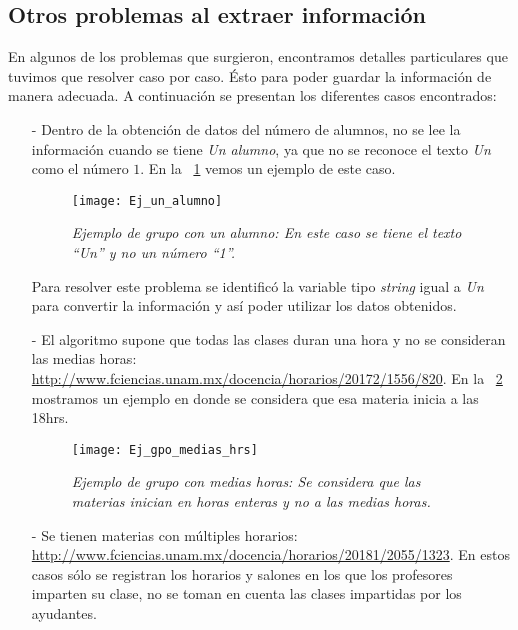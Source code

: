 \subsection{Otros problemas al extraer información}

En algunos de los problemas que surgieron, encontramos detalles particulares que tuvimos que resolver caso por caso. Ésto para poder guardar la información de manera adecuada. A continuación se presentan los diferentes casos encontrados:

  \begin{itemize}
\item[-] Dentro de la obtención de datos del número de alumnos, no se lee la información cuando se tiene \textit{Un alumno}, ya que no se reconoce el texto \textit{Un} como el número $1$. En la \figurename{~\ref{UnAlumno}} vemos un ejemplo de este caso.

\begin{figure}[H]
\centering
\texttt{[image: Ej\_un\_alumno]} %
\caption[\textit{Ejemplo de grupo con un alumno}]{\textit{Ejemplo de grupo con un alumno: En este caso se tiene el texto ``Un'' y no un número ``1''.}}\label{UnAlumno}
\end{figure}

Para resolver este problema se identificó la variable tipo \textit{string} igual a \textit{Un} para convertir la información y así poder utilizar los datos obtenidos.

\item[-] El algoritmo supone que todas las clases duran una hora y no se consideran las medias horas: \url{http://www.fciencias.unam.mx/docencia/horarios/20172/1556/820}. En la \figurename{~\ref{MediasHoras}} mostramos un ejemplo en donde se considera que esa materia inicia a las 18hrs.

\begin{figure}[H]
\centering
\texttt{[image: Ej\_gpo\_medias\_hrs]} %
\caption[\textit{Ejemplo de grupo con medias horas}]{\textit{Ejemplo de grupo con medias horas: Se considera que las materias inician en horas enteras y no a las medias horas.}}\label{MediasHoras}
\end{figure}

\item[-] Se tienen materias con múltiples horarios: \url{http://www.fciencias.unam.mx/docencia/horarios/20181/2055/1323}. En estos casos sólo se registran los horarios y salones en los que los profesores imparten su clase, no se toman en cuenta las clases impartidas por los ayudantes.


\end{itemize}
